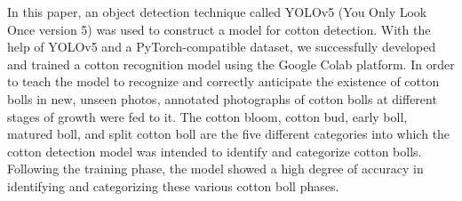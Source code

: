 \documentclass[12pt,a4paper]{report}
\begin{document}
\par   In this paper, an object detection technique called YOLOv5 (You Only Look Once version 5) was used to construct a model for cotton detection. With the help of YOLOv5 and a PyTorch-compatible dataset, we successfully developed and trained a cotton recognition model using the Google Colab platform. In order to teach the model to recognize and correctly anticipate the existence of cotton bolls in new, unseen photos, annotated photographs of cotton bolls at different stages of growth were fed to it. The cotton bloom, cotton bud, early boll, matured boll, and split cotton boll are the five different categories into which the cotton detection model was intended to identify and categorize cotton bolls. Following the training phase, the model showed a high degree of accuracy in identifying and categorizing these various cotton boll phases. 
\end{document}
